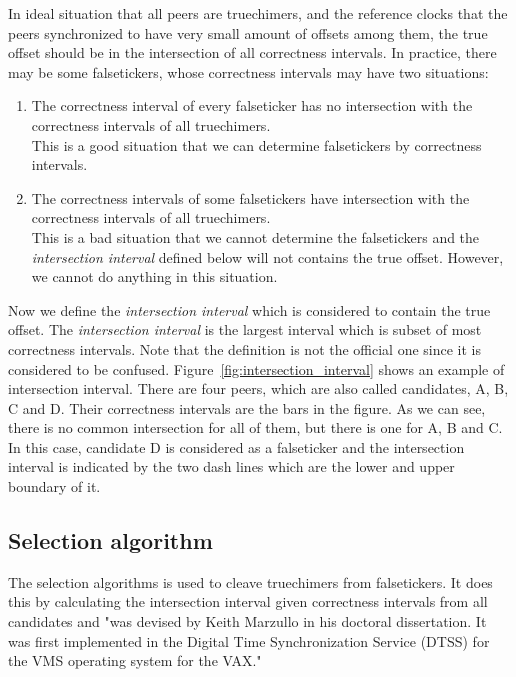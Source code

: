 In ideal situation that all peers are truechimers, and the reference clocks that
the peers synchronized to have very small amount of offsets among them, the
true offset should be in the intersection of all correctness intervals. In practice,
there may be some falsetickers, whose correctness intervals may have two situations:
\begin{enumerate}
    \item The correctness interval of every falseticker has no intersection with
        the correctness intervals of all truechimers.\\
        This is a good situation that we can determine falsetickers by correctness
        intervals.
    \item The correctness intervals of some falsetickers have intersection with
        the correctness intervals of all truechimers.\\
        This is a bad situation that we cannot determine the falsetickers and the 
        \emph{intersection interval} defined below will not contains the true offset.
        However, we cannot do anything in this situation.
\end{enumerate}

Now we define the \emph{intersection interval} which is considered to contain
the true offset. The \emph{intersection interval} is the largest interval
which is subset of most correctness intervals. Note that the definition is
not the official one since it is considered to be confused.
Figure~\ref{fig:intersection_interval} shows an example of intersection
interval. There are four peers, which are also called candidates, A, B, C and
D. Their correctness intervals are the bars in the figure. As we can see,
there is no common intersection for all of them, but there is one for A, B
and C. In this case, candidate D is considered as a falseticker and the
intersection interval is indicated by the two dash lines which are the lower
and upper boundary of it.



\subsection{Selection algorithm}%
\label{sub:selection_algorithm}
The selection algorithms is used to cleave truechimers from falsetickers. It does this
by calculating the intersection interval given correctness intervals from all 
candidates and "was devised by Keith Marzullo in his doctoral dissertation.
It was first implemented in the Digital Time Synchronization Service (DTSS)
for the VMS operating system for the VAX\null."~\cite{clock_selection}

